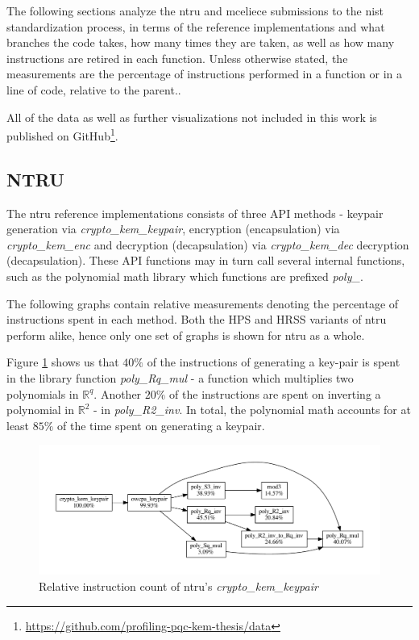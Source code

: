 The following sections analyze the \gls{ntru} and \gls{mceliece} submissions to the \gls{nist} standardization process, in terms of the reference implementations and what branches the code takes, how many times they are taken, as well as how many instructions are retired in each function. Unless otherwise stated, the measurements are the percentage of instructions performed in a function or in a line of code, relative to the parent..

All of the data as well as further visualizations not included in this work is published on GitHub\footnote{\href{https://github.com/profiling-pqc-kem-thesis/data}{https://github.com/profiling-pqc-kem-thesis/data}}.


\subsection{NTRU}

The \gls{ntru} reference implementations consists of three API methods - keypair generation via \textit{crypto\_kem\_keypair}, encryption (encapsulation) via \textit{crypto\_kem\_enc} and decryption (decapsulation) via \textit{crypto\_kem\_dec}  decryption (decapsulation). These API functions may in turn call several internal functions, such as the polynomial math library which functions are prefixed \textit{poly\_}.

The following graphs contain relative measurements denoting the percentage of instructions spent in each method. Both the HPS and HRSS variants of \gls{ntru} perform alike, hence only one set of graphs is shown for \gls{ntru} as a whole.

Figure \ref{figure:result:hot-paths:ntru:crypto_kem_keypair} shows us that $40\%$ of the instructions of generating a key-pair is spent in the library function \textit{poly\_Rq\_mul} - a function which multiplies two polynomials in $\mathbb{R}^q$. Another $20\%$ of the instructions are spent on inverting a polynomial in $\mathbb{R}^2$ - in \textit{poly\_R2\_inv}. In total, the polynomial math accounts for at least $85\%$ of the time spent on generating a keypair.

\begin{figure}[H]
    \centering
    \includegraphics[scale=0.5]{chapters/results/hot-paths/ntru/crypto_kem_keypair.pdf}
    \caption{Relative instruction count of \gls{ntru}'s \textit{crypto\_kem\_keypair}}
    \label{figure:result:hot-paths:ntru:crypto_kem_keypair}
\end{figure}

